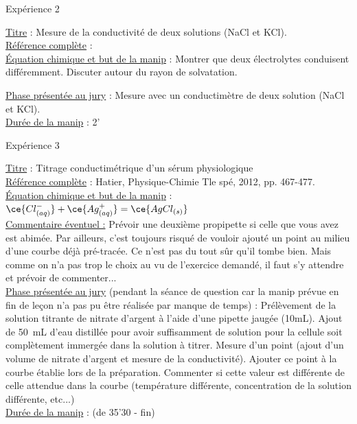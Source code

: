 \begin{reportBlock}{Expérience 2}

\underline{Titre} : Mesure de la conductivité de deux solutions (NaCl et KCl). \\

\underline{Référence complète} :  \\ 

\underline{Équation chimique et but de la manip} : Montrer que deux électrolytes conduisent différemment. Discuter autour du rayon de solvatation.

\underline{Phase présentée au jury} : Mesure avec un conductimètre de deux solution (NaCl et KCl). \\

\underline{Durée de la manip} : 2' \\

\end{reportBlock}


\begin{reportBlock}{Expérience 3}

\underline{Titre} : Titrage conductimétrique d'un sérum physiologique \\

\underline{Référence complète} : Hatier, Physique-Chimie Tle spé, 2012, pp.  467-477. \\ 

\underline{Équation chimique et but de la manip} : $ \ce{Cl^{-}_{(aq)}} +\ce{ Ag^+_{(aq)}} = \ce{AgCl_{(s)}}$ \\


\underline{Commentaire éventuel :} Prévoir une deuxième propipette si celle que vous avez est abimée. Par ailleurs, c'est toujours risqué de vouloir ajouté un point au milieu d'une courbe déjà pré-tracée. Ce n'est pas du tout sûr qu'il tombe bien. Mais comme on n'a pas trop le choix au vu de l'exercice demandé, il faut s'y attendre et prévoir de commenter...\\

\underline{Phase présentée au jury} (pendant la séance de question car la manip prévue en fin de leçon n'a pas pu être réalisée par manque de temps) : Prélèvement de la solution titrante de nitrate d'argent à l'aide d'une pipette jaugée (10mL). Ajout de 50~mL d'eau distillée pour avoir suffisamment de solution pour la cellule soit complètement immergée dans la solution à titrer. Mesure d'un point (ajout d'un volume de nitrate d'argent et mesure de la conductivité). Ajouter ce point à la courbe établie lors de la préparation. Commenter si cette valeur est différente de celle attendue dans la courbe (température différente, concentration de la solution différente, etc...)\\

\underline{Durée de la manip} : (de 35'30 - fin) \\

\end{reportBlock}




